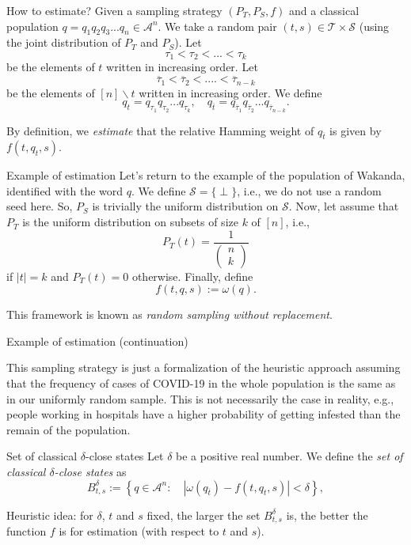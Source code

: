\documentclass{beamer}
\begin{document}
\begin{frame}{How to estimate?} 
Given a sampling strategy $\left(P_T, P_S, f \right)$ and a classical population $q = q_1 q_2 q_3 ... q_n \in \mathcal{A}^n$. We take a random pair $(t, s) \in \mathcal{T} \times \mathcal{S}$ (using the joint distribution of $P_T$ and $P_S$). Let
$$
\tau_1 < \tau_2 < ... < \tau_{k}
$$
be the elements of $t$ written in increasing order. Let
$$
\overline{\tau }_1 < \overline{\tau}_2 < .... < \overline{\tau}_{n-k}
$$
be the elements of $[n]\backslash t$ written in increasing order. We define
$$
q_t = q_{\tau_1} q_{\tau_2} ... q_{\tau_k}, \quad q_{\overline{t}} = q_{\overline{\tau}_1} q_{\overline{\tau}_2} ... q_{\overline{\tau}_{n-k}}.
$$

By definition, we \emph{estimate} that the relative Hamming weight of $q_{\overline{t}}$ is given by $f\left(t, q_t, s\right)$.
\end{frame}

\begin{frame}{Example of estimation} 
Let's return to the example of the population of Wakanda, identified with the word $q$. We define $\mathcal{S} = \{\perp\}$, i.e., we do not use a random seed here. So, $P_S$ is trivially the uniform distribution on $\mathcal{S}$. Now, let assume that $P_T$ is the uniform distribution on subsets of size $k$ of $[n]$, i.e., 
$$P_T(t) = \frac{1}{\left(\!\!\! \begin{array}{c} n \\ k \end{array} \!\!\!\right)}$$
if $|t| = k$ and $P_T(t) = 0$ otherwise. Finally, define $$f(t, q, s) := \omega(q).$$ 

This framework is known as \emph{random sampling without replacement}.

\end{frame}

\begin{frame}{Example of estimation (continuation)} 

This sampling strategy is just a formalization of the heuristic approach assuming that the frequency of cases of COVID-19 in the whole population is the same as in our uniformly random sample. This is not necessarily the case in reality, e.g., people working in hospitals have a higher probability of getting infested than the remain of the population.
\end{frame}

\begin{frame}{Set of classical $\delta$-close states} 
Let $\delta$ be a positive real number. We define the  \emph{set of classical $\delta$-close states} as
$$
B_{t,s}^{\delta} := \left\{ q\in\mathcal{A}^n: \quad \left| \omega\left(q_{\overline{t}}\right) - f\left(t, q_t, s\right) \right| <  \delta \right\},
$$

Heuristic idea: for $\delta$, $t$ and $s$ fixed, the larger the set $B_{t,s}^{\delta}$ is, the better the function $f$ is for estimation (with respect to $t$ and $s$).
\end{frame}
\end{document}
